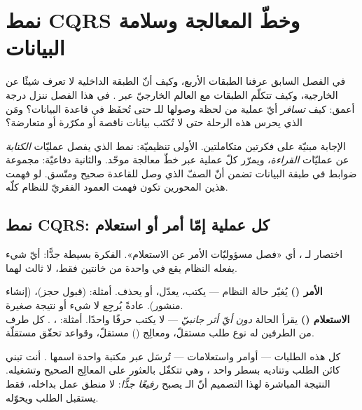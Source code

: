 \section{نمط CQRS وخطّ المعالجة وسلامة البيانات}

في الفصل السابق عرفنا الطبقات الأربع، وكيف أنّ الطبقة الداخلية لا تعرف شيئًا عن
الخارجية، وكيف تتكلّم الطبقات مع العالم الخارجيّ عبر . في هذا
الفصل ننزل درجة أعمق: كيف \emph{تسافر} أيّ عملية من لحظة وصولها للـ  حتى
تُحفَظ في قاعدة البيانات؟ ومَن الذي يحرس هذه الرحلة حتى لا تُكتَب بيانات ناقصة أو
مكرّرة أو متعارضة؟

الإجابة مبنيّة على فكرتين متكاملتين. الأولى تنظيميّة: نمط  الذي يفصل عمليّات
\emph{الكتابة} عن عمليّات \emph{القراءة}، ويمرّر كلّ عملية عبر خطّ معالجة موحّد. والثانية
دفاعيّة: مجموعة ضوابط في طبقة البيانات تضمن أنّ الصفّ الذي وصل للقاعدة صحيح ومتّسق. لو
فهمت هذين المحورين تكون فهمت العمود الفقريّ للنظام كلّه.

\subsection{نمط CQRS: كل عملية إمّا أمر أو استعلام}

 اختصار لـ ، أي «فصل مسؤوليّات
الأمر عن الاستعلام». الفكرة بسيطة جدًّا: أيّ شيء يفعله النظام يقع في واحدة من خانتين
فقط، لا ثالث لهما.

\begin{idea}
\textbf{الأمر ()} يُغيّر حالة النظام — يكتب، يعدّل، أو يحذف. أمثلة:
 (قبول حجز)،  (إنشاء منشور).
عادةً يُرجِع لا شيء أو نتيجة صغيرة.\\[4pt]
\textbf{الاستعلام ()} يقرأ الحالة \emph{دون أيّ أثر جانبيّ} — لا يكتب حرفًا
واحدًا. أمثلة: ، .
كل طرف من الطرفين له نوع طلب مستقلّ، ومعالِج () مستقلّ، وقواعد تحقّق
مستقلّة.
\end{idea}

كل هذه الطلبات — أوامر واستعلامات — تُرسَل عبر مكتبة واحدة اسمها . أنت
تبني كائن الطلب وتناديه بسطر واحد ، وهي تتكفّل بالعثور على
المعالِج الصحيح وتشغيله. النتيجة المباشرة لهذا التصميم أنّ الـ  يصبح
\emph{رفيعًا جدًّا}: لا منطق عمل بداخله، فقط يستقبل الطلب ويحوّله.

